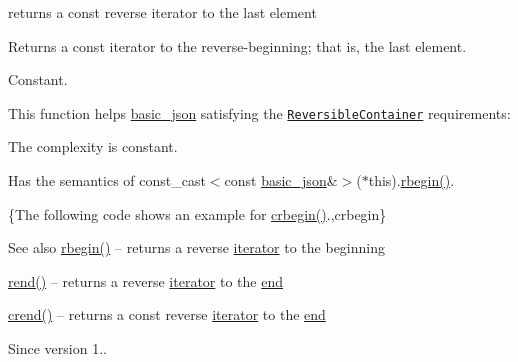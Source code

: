returns a const reverse iterator to the last element 

Returns a const iterator to the reverse-\/beginning; that is, the last element.

  Constant.

This function helps {\ttfamily \hyperlink{classnlohmann_1_1basic__json}{basic\+\_\+json}} satisfying the \href{https://en.cppreference.com/w/cpp/named_req/ReversibleContainer}{\tt Reversible\+Container} requirements\+:
\begin{DoxyItemize}
\item The complexity is constant.
\item Has the semantics of {\ttfamily const\+\_\+cast$<$const \hyperlink{classnlohmann_1_1basic__json}{basic\+\_\+json}\&$>$($\ast$this).\hyperlink{classnlohmann_1_1basic__json_a1ef93e2006dbe52667294f5ef38b0b10}{rbegin()}}.
\end{DoxyItemize}

\{The following code shows an example for {\ttfamily \hyperlink{classnlohmann_1_1basic__json_a1e0769d22d54573f294da0e5c6abc9de}{crbegin()}}.,crbegin\}

\begin{DoxySeeAlso}{See also}
\hyperlink{classnlohmann_1_1basic__json_a1ef93e2006dbe52667294f5ef38b0b10}{rbegin()} -- returns a reverse \hyperlink{classnlohmann_1_1basic__json_a099316232c76c034030a38faa6e34dca}{iterator} to the beginning 

\hyperlink{classnlohmann_1_1basic__json_ac77aed0925d447744676725ab0b6d535}{rend()} -- returns a reverse \hyperlink{classnlohmann_1_1basic__json_a099316232c76c034030a38faa6e34dca}{iterator} to the \hyperlink{classnlohmann_1_1basic__json_a13e032a02a7fd8a93fdddc2fcbc4763c}{end} 

\hyperlink{classnlohmann_1_1basic__json_a5795b029dbf28e0cb2c7a439ec5d0a88}{crend()} -- returns a const reverse \hyperlink{classnlohmann_1_1basic__json_a099316232c76c034030a38faa6e34dca}{iterator} to the \hyperlink{classnlohmann_1_1basic__json_a13e032a02a7fd8a93fdddc2fcbc4763c}{end}
\end{DoxySeeAlso}
\begin{DoxySince}{Since}
version 1.. 
\end{DoxySince}
